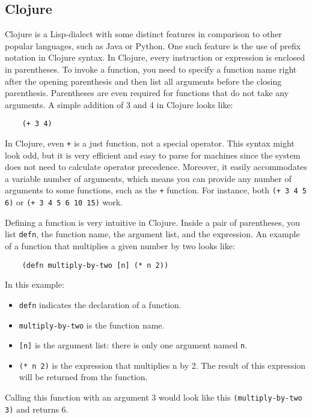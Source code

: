 \documentclass[12pt]{article}
\newcommand{\comment}[1]{{\bf \tt  {#1}}}
\newcommand{\emcomment}[1]{\textcolor{ForestGreen}{\comment{Elena: {#1}}}}
\newcommand{\tscomment}[1]{\textcolor{Teal}{\comment{Tony: {#1}}}}
\begin{document}
	\subsection{Clojure}
	Clojure is a Lisp-dialect with some distinct features in comparison to other popular languages, such as Java or Python.
	One such feature is the use of prefix notation in Clojure syntax. In Clojure, every instruction or expression is enclosed in parentheses.
	To invoke a function, you need to specify a function name right after the opening parenthesis and then list all arguments before the 
	closing parenthesis. Parentheses are even required for functions that do not take any arguments.  
	A simple addition of 3 and 4 in Clojure looks like: 
	\begin{verbatim}
	(+ 3 4)
	\end{verbatim}
	In Clojure, even \texttt{+} is a just function, not a special operator. This syntax might look odd, but it is very efficient and easy to parse for machines since the system does not need to 
	calculate operator precedence. Moreover, it easily accommodates a variable number of arguments, which means
	you can provide any number of arguments to some functions, such as the {\tt +} function. For instance,  both {\tt (+ 3 4 5 6)}
	or {\tt (+ 3 4 5 6 10 15)} work.
	
	Defining a function is very intuitive in Clojure. Inside a pair of parentheses, you list \texttt{defn}, the function name, 
	the argument list, and the expression.
	An example of a function that multiplies a given number by two looks like:
	\begin{verbatim}
	(defn multiply-by-two [n] (* n 2))
	\end{verbatim}
	In this example:
	\begin{itemize}
	\item {\tt defn} indicates the declaration of a function.
	\item {\tt multiply-by-two} is the function name.
	\item \texttt{[n]} is the argument list: there is only one argument named {\tt n}.
	\item {\tt (* n 2)} is the expression that multiplies n by 2. The result of this expression will be returned from the function. 
	\end{itemize}
	Calling this function with an argument 3 would look like this {\tt (multiply-by-two 3)} and returns 6.
	
\end{document}
